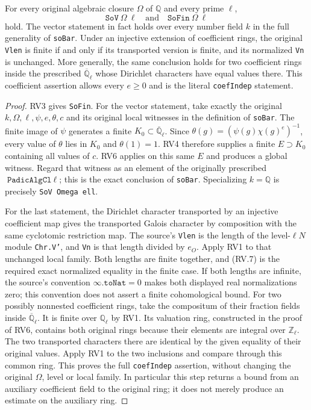 \begin{theorem}
\label{claim:RV7}
For every original algebraic closure $\Omega$ of $\mathbb Q$
and every prime $\ell$,
\[
       \texttt{SoV}\ \Omega\ \ell
              \quad\text{and}\quad
       \texttt{SoFin}\ \Omega\ \ell
 \tag{RV.32}
\]
hold.  The vector statement in fact holds over every number
field $k$ in the full generality of \texttt{soBar}.
Under an injective extension of coefficient rings, the original
\texttt{Vlen} is finite if and only if its transported version is
finite, and its normalized \texttt{Vn} is unchanged.
More generally, the same conclusion holds for two coefficient rings
inside the prescribed $\overline{\mathbb Q}_\ell$ whose Dirichlet
characters have equal values there.  This coefficient assertion
allows every $e\ge0$ and is the literal \texttt{coefIndep} statement.
\end{theorem}

\begin{proof}
RV3 gives \texttt{SoFin}.
For the vector statement, take exactly the original
$k,\Omega,\ell,\psi,e,\theta,c$ and its original local witnesses
in the definition of \texttt{soBar}.
The finite image of $\psi$ generates a finite
$K_0\subset\overline{\mathbb Q}_\ell$.
Since $\theta(g)=(\psi(g)\chi(g)^e)^{-1}$, every value of
$\theta$ lies in $K_0$ and $\theta(1)=1$.
RV4 therefore supplies a finite $E\supset K_0$ containing all
values of $c$.
RV6 applies on this same $E$ and produces a global witness.
Regard that witness as an element of the originally prescribed
$\texttt{PadicAlgCl}\ \ell$; this is the exact conclusion of
\texttt{soBar}.  Specializing $k=\mathbb Q$ is precisely
\texttt{SoV Omega ell}.

For the last statement, the Dirichlet character transported by an
injective coefficient map gives the transported Galois character
by composition with the same cyclotomic restriction map.
The source's \texttt{Vlen} is the length of the level-$\ell N$
module \texttt{Chr.V'}, and \texttt{Vn} is that length divided by
$e_O$.  Apply RV1 to that unchanged local family.
Both lengths are finite together, and (RV.7) is the required
exact normalized equality in the finite case.  If both lengths
are infinite, the source's convention $\infty.\texttt{toNat}=0$
makes both displayed real normalizations zero; this convention
does not assert a finite cohomological bound.
For two possibly nonnested coefficient rings, take the compositum
of their fraction fields inside $\overline{\mathbb Q}_\ell$.
It is finite over $\mathbb Q_\ell$ by RV1.
Its valuation ring, constructed in the proof of RV6, contains both
original rings because their elements are integral over
$\mathbb Z_\ell$.  The two transported characters there are
identical by the given equality of their original values.
Apply RV1 to the two inclusions and compare through this common
ring.  This proves the full \texttt{coefIndep} assertion, without
changing the original $\Omega$, level or local family.
In particular this step returns a
bound from an auxiliary coefficient field to the original ring;
it does not merely produce an estimate on the auxiliary ring.
\end{proof}


